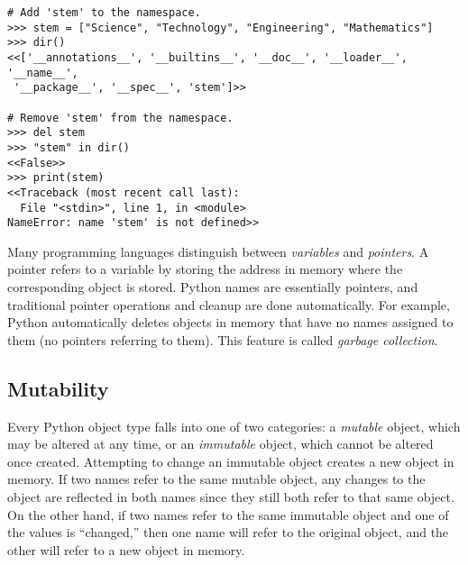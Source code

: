 \begin{lstlisting}
# Add 'stem' to the namespace.
>>> stem = ["Science", "Technology", "Engineering", "Mathematics"]
>>> dir()
<<['__annotations__', '__builtins__', '__doc__', '__loader__', '__name__',
 '__package__', '__spec__', 'stem']>>

# Remove 'stem' from the namespace.
>>> del stem
>>> "stem" in dir()
<<False>>
>>> print(stem)
<<Traceback (most recent call last):
  File "<stdin>", line 1, in <module>
NameError: name 'stem' is not defined>>
\end{lstlisting}

\begin{info}
Many programming languages distinguish between \emph{variables} and \emph{pointers}.
A pointer refers to a variable by storing the address in memory where the corresponding object is stored.
Python names are essentially pointers, and traditional pointer operations and cleanup are done automatically.
For example, Python automatically deletes objects in memory that have no names assigned to them (no pointers referring to them).
This feature is called \emph{garbage collection}.
\end{info}

\subsection*{Mutability} %

Every Python object type falls into one of two categories: a \emph{mutable} object, which may be altered at any time, or an \emph{immutable} object, which cannot be altered once created.
Attempting to change an immutable object creates a new object in memory.
If two names refer to the same mutable object, any changes to the object are reflected in both names since they still both refer to that same object.
On the other hand, if two names refer to the same immutable object and one of the values is ``changed,'' then one name will refer to the original object, and the other will refer to a new object in memory.

